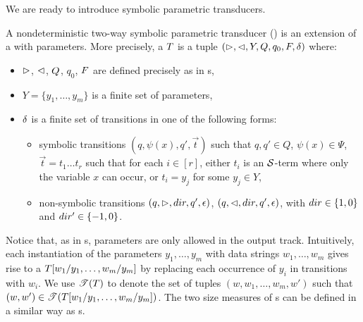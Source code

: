 
We are ready to introduce symbolic parametric transducers.

\begin{definition}
A nondeterministic two-way symbolic parametric transducer (\SSPT) is an extension of a \SST{} with parameters. More precisely,  a \SSPT{} $T$ is a tuple
$(\vartriangleright, \vartriangleleft, Y, Q, q_0, F, \delta)$ where:
\begin{itemize}
%
\item $\vartriangleright$, $\vartriangleleft$, $Q$, $q_0$, $F$ are defined precisely as in \SST{}s, 
%
\item $Y=\{y_1,\ldots, y_m\}$ is a finite set of parameters, 
%
\item $\delta$ is a finite set of transitions in one of the following forms: 
\begin{itemize}
\item symbolic transitions $(q, \psi(x), q', \vec{t})$ such that $q,q' \in Q$, $\psi(x) \in \Psi$,
$\vec{t} = t_1 \ldots t_r$ such that for each $i \in [r]$, either $t_i$ is an $\mathcal{S}$-term where only the variable $x$ can occur, or $t_i = y_j$ for some $y_j \in Y$,
%
\item non-symbolic transitions $(q, \vartriangleright, dir, q', \epsilon)$, $(q, \vartriangleleft, dir, q', \epsilon)$, with $dir \in \{1, 0\}$ and $dir' \in \{-1, 0\}$. 
\end{itemize}
\end{itemize}
\end{definition}

Notice that, as in \PPT{}s, parameters are only allowed in the output track.
Intuitively, each instantiation of the parameters $y_1,\ldots, y_m$ with data strings 
$w_1,\ldots, w_m$ gives rise to a \SST{} $T[w_1/y_1,\ldots, w_m/y_m]$ by replacing each occurrence of $y_i$ in transitions with $w_i$. 
%
We use $\mathscr{T}(T)$ to denote the set of tuples $(w, w_1, \ldots, w_m, w')$ such that $(w, w') \in \mathscr{T}(T[w_1/y_1,\ldots, w_m/y_m])$.
The two size measures of \SSPT{}s can be defined in a similar way as \SST{}s. 


